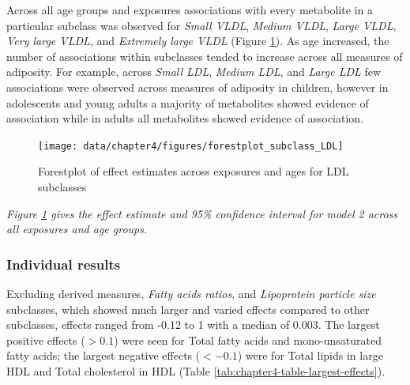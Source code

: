 \documentclass[11pt,twoside]{bristolthesis}
\newcommand{\bsmall}{\begin{small}}
\newcommand{\esmall}{\end{small}}
\begin{document}
Across all age groups and exposures associations with every metabolite in a particular subclass was observed for \emph{Small VLDL}, \emph{Medium VLDL}, \emph{Large VLDL}, \emph{Very large VLDL}, and \emph{Extremely large VLDL} (Figure \ref{fig:chapter4-figure-forestplot-subclass-LDL}). As age increased, the number of associations within subclasses tended to increase across all measures of adiposity. For example, across \emph{Small LDL}, \emph{Medium LDL}, and \emph{Large LDL} few associations were observed across measures of adiposity in children, however in adolescents and young adults a majority of metabolites showed evidence of association while in adults all metabolites showed evidence of association.
\begin{figure}
\texttt{[image: data/chapter4/figures/forestplot\_subclass\_LDL]} \caption{Forestplot of effect estimates across exposures and ages for LDL subclasses}\label{fig:chapter4-figure-forestplot-subclass-LDL}
\end{figure}
\noindent 
\bsmall
\emph{Figure \ref{fig:chapter4-figure-forestplot-subclass-LDL} gives the effect estimate and 95\% confidence interval for model 2 across all exposures and age groups.}
\esmall

\hypertarget{individual-results}{%
\subsubsection{Individual results}\label{individual-results}}

Excluding derived measures, \emph{Fatty acids ratios}, and \emph{Lipoprotein particle size} subclasses, which showed much larger and varied effects compared to other subclasses, effects ranged from -0.12 to 1 with a median of 0.003. The largest positive effects (\(> 0.1\)) were seen for Total fatty acids and mono-unsaturated fatty acids; the largest negative effects (\(< -0.1\)) were for Total lipids in large HDL and Total cholesterol in HDL (Table \ref{tab:chapter4-table-largest-effects}).
\end{document}

